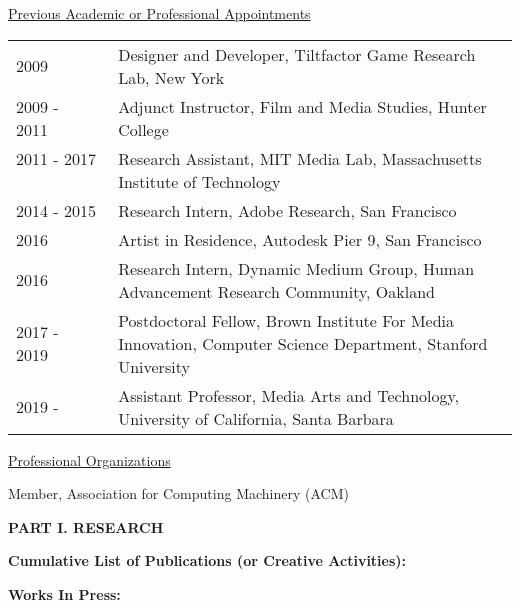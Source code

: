 \documentclass[10pt]{article}
\begin{document}
\vspace{0.5cm}
\underline{Previous Academic or Professional Appointments}
\begin{tabular}{l p{5.5in} }

2009 \ \ \ \  & Designer and Developer, Tiltfactor Game Research Lab, New York \\
2009 - 2011\ \ \ \ & Adjunct Instructor, Film and Media Studies, Hunter College \\ 
2011 - 2017 \ \ \ \ & Research Assistant, MIT Media Lab, Massachusetts Institute of Technology \\
2014 - 2015 & Research Intern, Adobe Research, San Francisco\\
2016 & Artist in Residence, Autodesk Pier 9, San Francisco \\
2016 & Research Intern, Dynamic Medium Group, Human Advancement Research Community, Oakland \\
2017 - 2019\ \ \ \ & Postdoctoral Fellow, Brown Institute For Media Innovation, Computer Science Department, Stanford University\\
2019 - \ \ \ \ & Assistant Professor, Media Arts and Technology, University of California, Santa Barbara\\ 

\end{tabular}

\vspace{0.5cm}
\underline{Professional Organizations}

Member, Association for Computing Machinery (ACM) 

\vspace{0.5cm}

\newpage

\textbf{PART I.  RESEARCH}

\vspace{0.2cm}
{\bf Cumulative List of Publications (or Creative Activities):}

{\setlength{\extrarowheight}{3.5pt}
}

\vspace{0.2cm}
{\bf Works In Press:}

{\setlength{\extrarowheight}{3.5pt}

}

 

\vspace{0.2cm}
\end{document}
